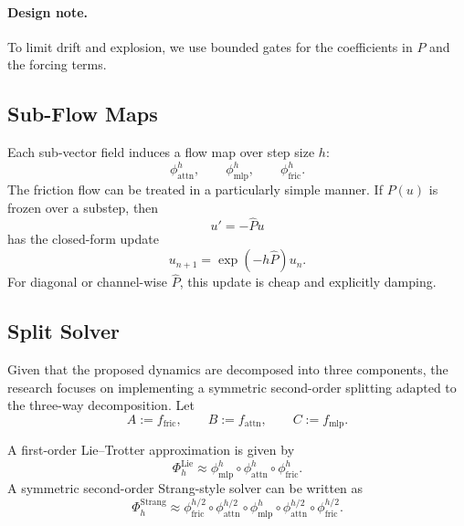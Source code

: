 \documentclass{article}
\newcommand{\Flow}{\Phi}
\newcommand{\Attn}{\mathrm{attn}}
\newcommand{\MLP}{\mathrm{mlp}}
\newcommand{\Fric}{\mathrm{fric}}
\newcommand{\Lie}{\mathrm{Lie}}
\newcommand{\Strang}{\mathrm{Strang}}
\begin{document}
\paragraph{Design note.}
To limit drift and explosion, we use bounded gates for the coefficients in $P$ and the forcing terms.

\subsection{Sub-Flow Maps}
Each sub-vector field induces a flow map over step size $h$:
\begin{equation}
    \phi_{\Attn}^{h},
    \qquad
    \phi_{\MLP}^{h},
    \qquad
    \phi_{\Fric}^{h}.
\end{equation}
The friction flow can be treated in a particularly simple manner. If $P(u)$ is frozen over a substep, then
\begin{equation}
    u' = -\widehat{P}u
\end{equation}
has the closed-form update
\begin{equation}
    u_{n+1} = \exp(-h\widehat{P})u_n.
\end{equation}
For diagonal or channel-wise $\widehat{P}$, this update is cheap and explicitly damping.

\subsection{Split Solver}
Given that the proposed dynamics are decomposed into three components, the research focuses on implementing a symmetric second-order splitting adapted to the three-way decomposition. Let
\begin{equation}
    A := f_{\Fric},
    \qquad
    B := f_{\Attn},
    \qquad
    C := f_{\MLP}.
\end{equation}

A first-order Lie--Trotter approximation is given by
\begin{equation}
    \Flow_h^{\Lie}
    \approx
    \phi_{\MLP}^{h}
    \circ
    \phi_{\Attn}^{h}
    \circ
    \phi_{\Fric}^{h}.
\end{equation}
A symmetric second-order Strang-style solver can be written as
\begin{equation}
    \Flow_h^{\Strang}
    \approx
    \phi_{\Fric}^{h/2}
    \circ
    \phi_{\Attn}^{h/2}
    \circ
    \phi_{\MLP}^{h}
    \circ
    \phi_{\Attn}^{h/2}
    \circ
    \phi_{\Fric}^{h/2}.
\end{equation}
\end{document}
